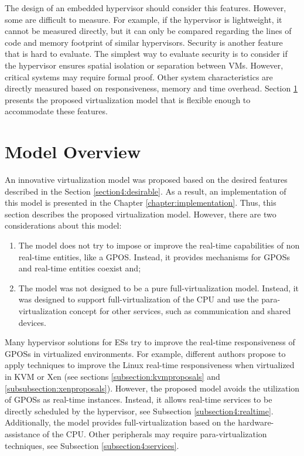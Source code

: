 The design of an embedded hypervisor should consider this features. However, some are difficult to measure. For example, if the hypervisor is lightweight, it cannot be measured directly, but it can only be compared regarding the lines of code and memory footprint of similar hypervisors. Security is another feature that is hard to evaluate. The simplest way to evaluate security is to consider if the hypervisor ensures spatial isolation or separation between VMs. However,  critical systems may require formal proof. Other system characteristics are directly measured based on responsiveness, memory and time overhead. Section \ref{section:propose} presents the proposed virtualization model that is flexible enough to accommodate these features. 



\section{Model Overview}
\label{section:propose}

An innovative virtualization model was proposed based on the desired features described in the Section \ref{section4:desirable}. As a result, an implementation of this model is presented in the Chapter \ref{chapter:implementation}. Thus, this section describes the proposed virtualization model. However, there are two considerations about this model:

\begin{enumerate}
  \item The model does not try to impose or improve the real-time capabilities of non real-time entities, like a GPOS. Instead, it provides mechanisms for GPOSs and real-time entities coexist and;
  
  \item The model was not designed to be a pure full-virtualization model. Instead, it was designed to support full-virtualization of the CPU and use the para-virtualization concept for other services, such as communication and shared devices.
\end{enumerate}

Many hypervisor solutions for ESs try to improve the real-time responsiveness of GPOSs in virtualized environments. For example, different authors propose to apply techniques to improve the Linux real-time responsiveness when virtualized in KVM or Xen (see sections \ref{subsection:kvmproposals} and \ref{subsubsection:xenproposals}). However, the proposed model avoids the utilization of GPOSs as real-time instances. Instead, it allows real-time services to be directly scheduled by the hypervisor, see Subsection \ref{subsection4:realtime}. Additionally, the model provides full-virtualization based on the hardware-assistance of the CPU. Other peripherals may require para-virtualization techniques, see Subsection \ref{subsection4:services}.  

